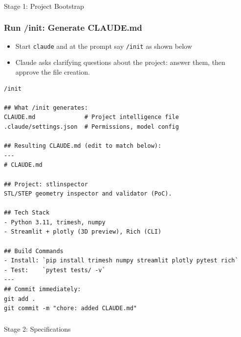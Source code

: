 \begin{frame}[fragile]\frametitle{}
\begin{center}
{\Large Stage 1: Project Bootstrap}
\end{center}
\end{frame}


\begin{frame}[fragile]\frametitle{Run /init: Generate CLAUDE.md}
  \begin{itemize}
	\item Start \lstinline|claude| and at the prompt say \lstinline|/init| as shown below
    \item Claude asks clarifying questions about the project: answer them, then approve the file creation.
  \end{itemize}

\begin{lstlisting}
/init

## What /init generates:
CLAUDE.md              # Project intelligence file
.claude/settings.json  # Permissions, model config

## Resulting CLAUDE.md (edit to match below):
---
# CLAUDE.md

## Project: stlinspector
STL/STEP geometry inspector and validator (PoC).

## Tech Stack
- Python 3.11, trimesh, numpy
- Streamlit + plotly (3D preview), Rich (CLI)

## Build Commands
- Install: `pip install trimesh numpy streamlit plotly pytest rich`
- Test:    `pytest tests/ -v`
---
## Commit immediately:
git add .
git commit -m "chore: added CLAUDE.md"
\end{lstlisting}
\end{frame}


\begin{frame}[fragile]\frametitle{}
\begin{center}
{\Large Stage 2: Specifications}
\end{center}
\end{frame}


